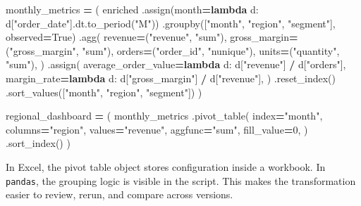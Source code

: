 \documentclass[
  12pt,
]{article}
\newenvironment{Shaded}{\begin{snugshade}}{\end{snugshade}}
\newcommand{\DecValTok}[1]{\textcolor[rgb]{0.00,0.00,0.81}{#1}}
\newcommand{\KeywordTok}[1]{\textcolor[rgb]{0.13,0.29,0.53}{\textbf{#1}}}
\newcommand{\NormalTok}[1]{#1}
\newcommand{\OperatorTok}[1]{\textcolor[rgb]{0.81,0.36,0.00}{\textbf{#1}}}
\newcommand{\StringTok}[1]{\textcolor[rgb]{0.31,0.60,0.02}{#1}}
\newcommand{\VariableTok}[1]{\textcolor[rgb]{0.00,0.00,0.00}{#1}}
\begin{document}
\begin{Shaded}
\begin{Highlighting}[]
\NormalTok{monthly\_metrics }\OperatorTok{=}\NormalTok{ (}
\NormalTok{    enriched}
\NormalTok{    .assign(month}\OperatorTok{=}\KeywordTok{lambda}\NormalTok{ d: d[}\StringTok{"order\_date"}\NormalTok{].dt.to\_period(}\StringTok{"M"}\NormalTok{))}
\NormalTok{    .groupby([}\StringTok{"month"}\NormalTok{, }\StringTok{"region"}\NormalTok{, }\StringTok{"segment"}\NormalTok{], observed}\OperatorTok{=}\VariableTok{True}\NormalTok{)}
\NormalTok{    .agg(}
\NormalTok{        revenue}\OperatorTok{=}\NormalTok{(}\StringTok{"revenue"}\NormalTok{, }\StringTok{"sum"}\NormalTok{),}
\NormalTok{        gross\_margin}\OperatorTok{=}\NormalTok{(}\StringTok{"gross\_margin"}\NormalTok{, }\StringTok{"sum"}\NormalTok{),}
\NormalTok{        orders}\OperatorTok{=}\NormalTok{(}\StringTok{"order\_id"}\NormalTok{, }\StringTok{"nunique"}\NormalTok{),}
\NormalTok{        units}\OperatorTok{=}\NormalTok{(}\StringTok{"quantity"}\NormalTok{, }\StringTok{"sum"}\NormalTok{),}
\NormalTok{    )}
\NormalTok{    .assign(}
\NormalTok{        average\_order\_value}\OperatorTok{=}\KeywordTok{lambda}\NormalTok{ d: d[}\StringTok{"revenue"}\NormalTok{] }\OperatorTok{/}\NormalTok{ d[}\StringTok{"orders"}\NormalTok{],}
\NormalTok{        margin\_rate}\OperatorTok{=}\KeywordTok{lambda}\NormalTok{ d: d[}\StringTok{"gross\_margin"}\NormalTok{] }\OperatorTok{/}\NormalTok{ d[}\StringTok{"revenue"}\NormalTok{],}
\NormalTok{    )}
\NormalTok{    .reset\_index()}
\NormalTok{    .sort\_values([}\StringTok{"month"}\NormalTok{, }\StringTok{"region"}\NormalTok{, }\StringTok{"segment"}\NormalTok{])}
\NormalTok{)}

\NormalTok{regional\_dashboard }\OperatorTok{=}\NormalTok{ (}
\NormalTok{    monthly\_metrics}
\NormalTok{    .pivot\_table(}
\NormalTok{        index}\OperatorTok{=}\StringTok{"month"}\NormalTok{,}
\NormalTok{        columns}\OperatorTok{=}\StringTok{"region"}\NormalTok{,}
\NormalTok{        values}\OperatorTok{=}\StringTok{"revenue"}\NormalTok{,}
\NormalTok{        aggfunc}\OperatorTok{=}\StringTok{"sum"}\NormalTok{,}
\NormalTok{        fill\_value}\OperatorTok{=}\DecValTok{0}\NormalTok{,}
\NormalTok{    )}
\NormalTok{    .sort\_index()}
\NormalTok{)}
\end{Highlighting}
\end{Shaded}

In Excel, the pivot table object stores configuration inside a workbook.
In \texttt{pandas}, the grouping logic is visible in the script. This
makes the transformation easier to review, rerun, and compare across
versions.
\end{document}
